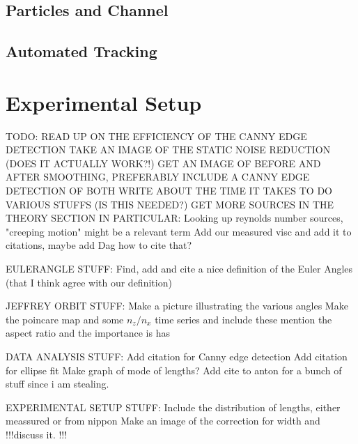 \documentclass[]{report}
\begin{document}
\subsection{Particles and Channel}




\subsection{Automated Tracking}

\section{Experimental Setup}




TODO:
READ UP ON THE EFFICIENCY OF THE CANNY EDGE DETECTION
TAKE AN IMAGE OF THE STATIC NOISE REDUCTION (DOES IT ACTUALLY WORK?!)
GET AN IMAGE OF BEFORE AND AFTER SMOOTHING, PREFERABLY INCLUDE A CANNY EDGE DETECTION OF BOTH 
WRITE ABOUT THE TIME IT TAKES TO DO VARIOUS STUFFS (IS THIS NEEDED?)
GET MORE SOURCES IN THE THEORY SECTION
IN PARTICULAR:
Looking up reynolds number sources, "creeping motion" might be a relevant term
Add our measured visc and add it to citations, maybe add Dag how to cite that?

EULERANGLE STUFF:
Find, add and cite a nice definition of the Euler Angles (that I think agree with our definition)

JEFFREY ORBIT STUFF:
Make a picture illustrating the various angles
Make the poincare map and some $n_z/n_x$ time series and include these
mention the aspect ratio and the importance is has

DATA ANALYSIS STUFF:
Add citation for Canny edge detection
Add citation for ellipse fit
Make graph of mode of lengths?
Add cite to anton for a bunch of stuff since i am stealing. 


EXPERIMENTAL SETUP STUFF:
Include the distribution of lengths, either meassured or from nippon
Make an image of the correction for width and !!!discuss it. !!!
\end{document}
